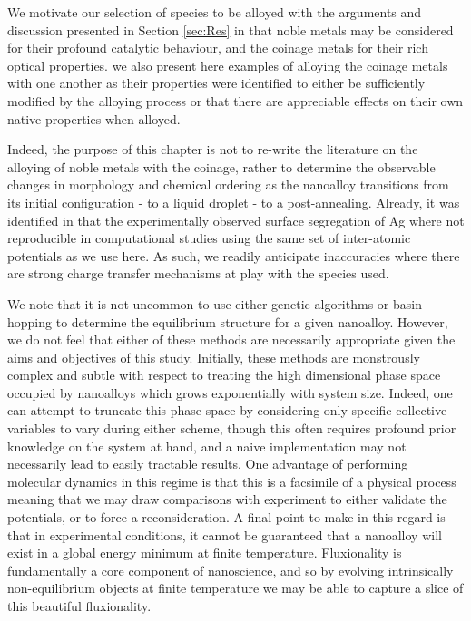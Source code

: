 We motivate our selection of species to be alloyed with the arguments and discussion presented in Section \ref{sec:Res} in that noble metals may be considered for their profound catalytic behaviour, and the coinage metals for their rich optical properties. we also present here examples of alloying the coinage metals with one another as their properties were identified to either be sufficiently modified by the alloying process or that there are appreciable effects on their own native properties when alloyed.

Indeed, the purpose of this chapter is not to re-write the literature on the alloying of noble metals with the coinage, rather to determine the observable changes in morphology and chemical ordering as the nanoalloy transitions from its initial configuration - to a liquid droplet - to a post-annealing. Already, it was identified in \cite{AgAuNanoparticles} that the experimentally observed surface segregation of Ag where not reproducible in computational studies using the same set of inter-atomic potentials as we use here. As such, we readily anticipate inaccuracies where there are strong charge transfer mechanisms at play with the species used.

We note that it is not uncommon to use either genetic algorithms \cite{YANG2018371,Fra_Ricardo_Review,Oakley2013-zl} or basin hopping \cite{Fra_Review,B204069G,doi:10.1021/jp207246m} to determine the equilibrium structure for a given nanoalloy. However, we do not feel that either of these methods are necessarily appropriate given the aims and objectives of this study. Initially, these methods are monstrously complex and subtle with respect to treating the high dimensional phase space occupied by nanoalloys which grows exponentially with system size. Indeed, one can attempt to truncate this phase space by considering only specific collective variables to vary during either scheme, though this often requires profound prior knowledge on the system at hand, and a naive implementation may not necessarily lead to easily tractable results. One advantage of performing molecular dynamics in this regime is that this is a facsimile of a physical process meaning that we may draw comparisons with experiment to either validate the potentials, or to force a reconsideration. A final point to make in this regard is that in experimental conditions, it cannot be guaranteed that a nanoalloy will exist in a global energy minimum at finite temperature. Fluxionality is fundamentally a core component of nanoscience, and so by evolving intrinsically non-equilibrium objects at finite temperature we may be able to capture a slice of this beautiful fluxionality.

